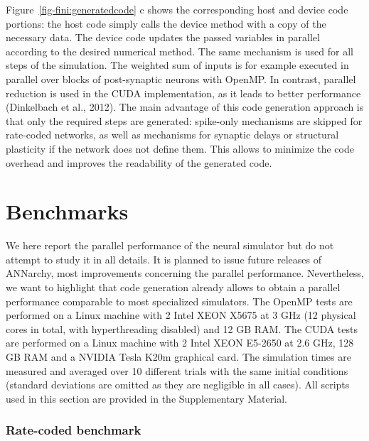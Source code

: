 \documentclass[
  11pt,
  a4paper,
]{scrbook}
\begin{document}
Figure~\ref{fig-fini:generatedcode} c shows the corresponding host and
device code portions: the host code simply calls the device method with
a copy of the necessary data. The device code updates the passed
variables in parallel according to the desired numerical method. The
same mechanism is used for all steps of the simulation. The weighted sum
of inputs is for example executed in parallel over blocks of
post-synaptic neurons with OpenMP. In contrast, parallel reduction is
used in the CUDA implementation, as it leads to better performance
(Dinkelbach et al., 2012). The main advantage of this code generation
approach is that only the required steps are generated: spike-only
mechanisms are skipped for rate-coded networks, as well as mechanisms
for synaptic delays or structural plasticity if the network does not
define them. This allows to minimize the code overhead and improves the
readability of the generated code.

\section{Benchmarks}\label{benchmarks}

We here report the parallel performance of the neural simulator but do
not attempt to study it in all details. It is planned to issue future
releases of ANNarchy, most improvements concerning the parallel
performance. Nevertheless, we want to highlight that code generation
already allows to obtain a parallel performance comparable to most
specialized simulators. The OpenMP tests are performed on a Linux
machine with 2 Intel XEON X5675 at 3 GHz (12 physical cores in total,
with hyperthreading disabled) and 12 GB RAM. The CUDA tests are
performed on a Linux machine with 2 Intel XEON E5-2650 at 2.6 GHz, 128
GB RAM and a NVIDIA Tesla K20m graphical card. The simulation times are
measured and averaged over 10 different trials with the same initial
conditions (standard deviations are omitted as they are negligible in
all cases). All scripts used in this section are provided in the
Supplementary Material.

\subsubsection*{Rate-coded benchmark}\label{rate-coded-benchmark}
\end{document}
